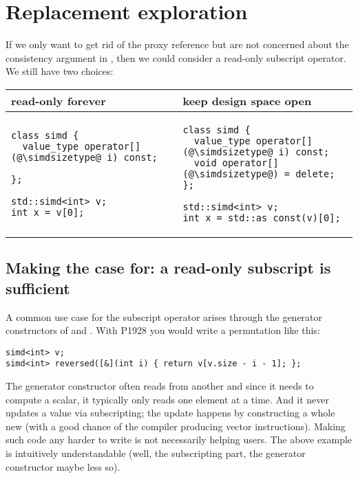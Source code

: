 \section{Replacement exploration}

If we only want to get rid of the proxy reference but are not concerned about
the consistency argument in , then we could consider a
read-only subscript operator.
We still have two choices:\\
\begingroup
  \smaller[1]
\begin{tabular}{p{}|p{}}
  read-only forever & keep design space open \\
  \hline
  \begin{lstlisting}
class simd {
  value_type operator[](@\simdsizetype@ i) const;

};
  \end{lstlisting}

  \medskip
  \begin{lstlisting}
std::simd<int> v;
int x = v[0];
  \end{lstlisting}
  &
  \begin{lstlisting}
class simd {
  value_type operator[](@\simdsizetype@ i) const;
  void operator[](@\simdsizetype@) = delete;
};
  \end{lstlisting}

  \medskip
  \begin{lstlisting}
std::simd<int> v;
int x = std::as_const(v)[0];
  \end{lstlisting}
\end{tabular}
\endgroup

\subsection{Making the case for: a read-only subscript is sufficient}

A common use case for the subscript operator arises through the generator
constructors of \simd and \mask.
With P1928 you would write a permutation like this:
\medskip\begin{lstlisting}[style=Vc]
simd<int> v;
simd<int> reversed([&](int i) { return v[v.size - i - 1]; };
\end{lstlisting}
The generator constructor often reads from another \simd and since it needs to
compute a scalar, it typically only reads one element at a time.
And it never updates a value via subscripting; the update happens by
constructing a whole new \simd (with a good chance of the compiler producing
vector instructions).
Making such code any harder to write is not necessarily helping users.
The above example is intuitively understandable (well, the subscripting part,
the generator constructor maybe less so).

